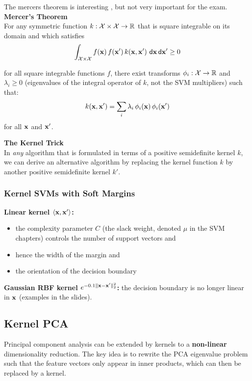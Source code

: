     The mercers theorem is interesting , but not very important for the exam. \\
	\textbf{Mercer's Theorem}\\
	For any symmetric function $k: {\cal X}\times {\cal X}\rightarrow \mathbb{R}$ that is square integrable on its domain and which satisfies
		\begin{displaymath}
			\int_{{\cal X}\times {\cal X}} f(\vect x)\,f(\vect x')\,k(\vect x, \vect x')\ \mathsf{d}\vect x\, \mathsf{d} \vect x' \geq 0
		\end{displaymath}

		for all square integrable functions $f$, there exist transforms $\phi_i: {\cal X}\rightarrow \mathbb{R}$ and $\lambda_i\geq 0$ (eigenvalues of the integral operator of $k$, not the SVM multipliers) such that:
		\begin{displaymath}
			k(\bm{\mathrm{x}}, \bm{\mathrm{x}}') = \sum_i \lambda_i \,\phi_i(\bm{\mathrm{x}})\,\phi_i(\bm{\mathrm{x}}')
		\end{displaymath} for all $\bm{\mathrm{x}}$ and $\bm{\mathrm{x}}'$.

	\textbf {The Kernel Trick} \\
	In \emph{any} algorithm that is formulated in terms of a positive semidefinite kernel $k$, we can derive an alternative algorithm by replacing the kernel function $k$ by another positive semidefinite kernel $k'$.

	\subsubsection{Kernel SVMs with Soft Margins}
		\textbf {Linear kernel $\langle\bm{\mathrm{x}}, \bm{\mathrm{x}}'\rangle$:}
		\begin{itemize}
			\item the complexity parameter $C$ (the slack weight, denoted $\mu$ in the SVM chapters) controls the number of support vectors and
			\item hence the width of the margin and
			\item the orientation of the decision boundary   
		\end{itemize}

	\textbf{Gaussian RBF kernel $e^{-0.1\|\bm{\mathrm{x}}-\bm{\mathrm{x}}'\|_2^2}$:} the decision boundary is no longer linear in $\bm{\mathrm{x}}$ (examples in the slides).

\subsection{Kernel PCA}
	Principal component analysis can be extended by kernels to a \textbf{non-linear} dimensionality reduction. The key idea is to rewrite the PCA eigenvalue problem such that the feature vectors only appear in inner products, which can then be replaced by a kernel.

